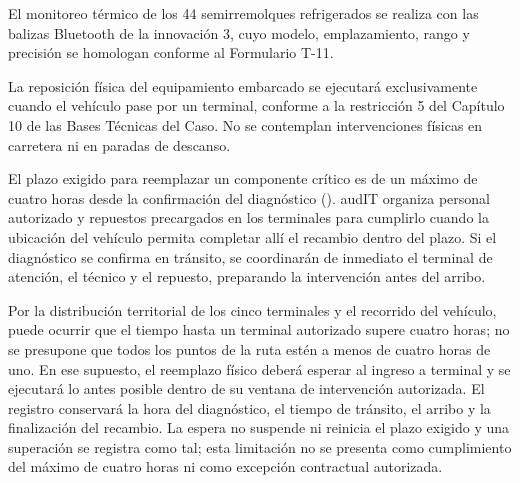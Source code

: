 El monitoreo térmico de los 44 semirremolques refrigerados se realiza con las balizas Bluetooth de la innovación 3, cuyo modelo, emplazamiento, rango y precisión se homologan conforme al Formulario T-11.

La reposición física del equipamiento embarcado se ejecutará exclusivamente cuando el vehículo pase por un terminal, conforme a la restricción 5 del Capítulo 10 de las Bases Técnicas del Caso. No se contemplan intervenciones físicas en carretera ni en paradas de descanso.

El plazo exigido para reemplazar un componente crítico es de un máximo de cuatro horas desde la confirmación del diagnóstico (). audIT organiza personal autorizado y repuestos precargados en los terminales para cumplirlo cuando la ubicación del vehículo permita completar allí el recambio dentro del plazo. Si el diagnóstico se confirma en tránsito, se coordinarán de inmediato el terminal de atención, el técnico y el repuesto, preparando la intervención antes del arribo.

Por la distribución territorial de los cinco terminales y el recorrido del vehículo, puede ocurrir que el tiempo hasta un terminal autorizado supere cuatro horas; no se presupone que todos los puntos de la ruta estén a menos de cuatro horas de uno. En ese supuesto, el reemplazo físico deberá esperar al ingreso a terminal y se ejecutará lo antes posible dentro de su ventana de intervención autorizada. El registro conservará la hora del diagnóstico, el tiempo de tránsito, el arribo y la finalización del recambio. La espera no suspende ni reinicia el plazo exigido y una superación se registra como tal; esta limitación no se presenta como cumplimiento del máximo de cuatro horas ni como excepción contractual autorizada.

